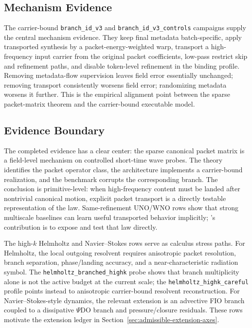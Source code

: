 \subsection{Mechanism Evidence}

The carrier-bound \texttt{branch\_id\_v3} and \texttt{branch\_id\_v3\_controls} campaigns supply the central mechanism evidence.  They keep final metadata batch-specific, apply transported synthesis by a packet-energy-weighted warp, transport a high-frequency input carrier from the original packet coefficients, low-pass restrict skip and refinement paths, and disable token-level refinement in the binding profile.  Removing metadata-flow supervision leaves field error essentially unchanged; removing transport consistently worsens field error; randomizing metadata worsens it further.  This is the empirical alignment point between the sparse packet-matrix theorem and the carrier-bound executable model.

\subsection{Evidence Boundary}

The completed evidence has a clear center: the sparse canonical packet matrix is a field-level mechanism on controlled short-time wave probes.  The theory identifies the packet operator class, the architecture implements a carrier-bound realization, and the benchmark corrupts the corresponding branch.  The conclusion is primitive-level: when high-frequency content must be landed after nontrivial canonical motion, explicit packet transport is a directly testable representation of the law.  Same-refinement UNO/WNO rows show that strong multiscale baselines can learn useful transported behavior implicitly; \MiNO's contribution is to expose and test that law directly.

The high-$k$ Helmholtz and Navier--Stokes rows serve as calculus stress paths.  For Helmholtz, the local outgoing resolvent requires anisotropic packet resolution, branch separation, phase/landing accuracy, and a near-characteristic radiation symbol.  The \texttt{helmholtz\_branched\_highk} probe shows that branch multiplicity alone is not the active budget at the current scale; the \texttt{helmholtz\_highk\_careful} profile points instead to anisotropic carrier-bound resolvent reconstruction.  For Navier--Stokes-style dynamics, the relevant extension is an advective FIO branch coupled to a dissipative $\Psi$DO branch and pressure/closure residuals.  These rows motivate the extension ledger in Section~\ref{sec:admissible-extension-axes}.

